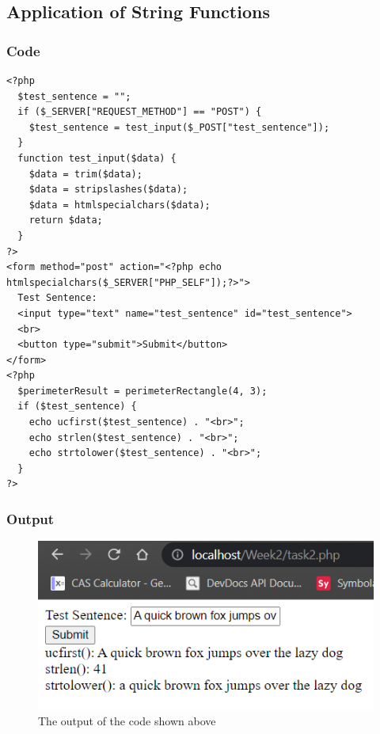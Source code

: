 \documentclass{article}
\begin{document}
        \subsection{Application of String Functions}
            \subsubsection{Code}
                \begin{verbatim}
<?php
  $test_sentence = "";
  if ($_SERVER["REQUEST_METHOD"] == "POST") {
    $test_sentence = test_input($_POST["test_sentence"]);
  }
  function test_input($data) {
    $data = trim($data);
    $data = stripslashes($data);
    $data = htmlspecialchars($data);
    return $data;
  }
?>
<form method="post" action="<?php echo htmlspecialchars($_SERVER["PHP_SELF"]);?>">
  Test Sentence:
  <input type="text" name="test_sentence" id="test_sentence">
  <br>
  <button type="submit">Submit</button>
</form>
<?php
  $perimeterResult = perimeterRectangle(4, 3);
  if ($test_sentence) {
    echo ucfirst($test_sentence) . "<br>";
    echo strlen($test_sentence) . "<br>";
    echo strtolower($test_sentence) . "<br>";
  }
?>
                \end{verbatim}
            \subsubsection{Output}    
                \begin{figure}[h]
                    \centering
                    \includegraphics{StringCodeOutput}
                    \caption{The output of the code shown above}
                \end{figure}
\end{document}
